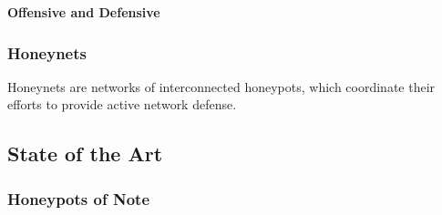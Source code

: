 \bullet \textbf{Offensive and Defensive}



\subsubsection{Honeynets}
Honeynets are networks of interconnected honeypots, which coordinate their efforts to provide active network defense.

\subsection{State of the Art}

\subsubsection{Honeypots of Note}

